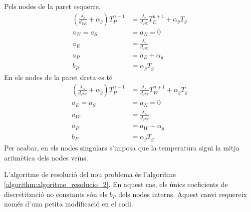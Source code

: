 Pels nodes de la paret esquerre,
\begin{align}
	\left( \frac{\lambda_e}{d_{PE}} + \alpha_g \right) T_P^{n+1} &= 
	\frac{\lambda_e}{d_{PE}} T_E^{n+1} + \alpha_g T_g \\
	a_W = a_S &= a_N = 0 \\
	a_E &= \frac{\lambda_e}{d_{PE}} \\
	a_P &= a_E + \alpha_g \\
	b_P &= \alpha_g T_g
\end{align}
En els nodes de la paret dreta es té
\begin{align}
	\left( \frac{\lambda_w}{d_{PW}} + \alpha_g \right) T_P^{n+1} &= 
	\frac{\lambda_w}{d_{PW}} T_W^{n+1} + \alpha_g T_g \\
	a_E = a_S &= a_N = 0 \\
	a_W &= \frac{\lambda_w}{d_{PW}} \\
	a_P &= a_W + \alpha_g \\
	b_P &= \alpha_g T_g
\end{align}
Per acabar, en els nodes singulars s'imposa que la temperatura sigui la mitja aritmètica dels nodes veïns.

L'algoritme de resolució del nou problema és l'algoritme \ref{algorithm:algoritme_resolucio_2}. En aquest cas, els únics coeficients de discretització no constants són els $b_P$ dels nodes interns. Aquest canvi requereix només d'una petita modificació en el codi.
